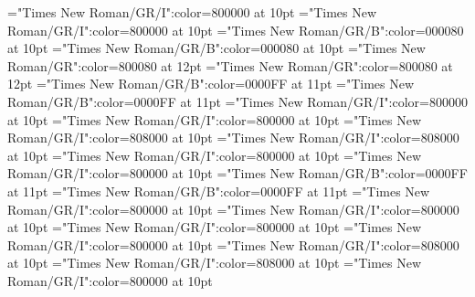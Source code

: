 \documentclass[a4paper,twoside]{article}
\begin{document}
\font\spanesownertypeabbreviationminimallexreferenceminimallexreferencesmainentrycomplex="Times New Roman/GR/I":color=800000 at 10pt
\font\spanownertypeabbreviationminimallexreferenceminimallexreferencesmainentrycomplex="Times New Roman/GR/I":color=800000 at 10pt
\font\spanmxbheadwordconfigtargetconfigtargetsminimallexreferenceminimallexreferencesmainentrycomplex="Times New Roman/GR/B":color=000080 at 10pt
\font\spanheadwordconfigtargetconfigtargetsminimallexreferenceminimallexreferencesmainentrycomplex="Times New Roman/GR/B":color=000080 at 10pt
\font\spanesliteralmeaningmainentrycomplex="Times New Roman/GR":color=800080 at 12pt
\font\spanliteralmeaningmainentrycomplex="Times New Roman/GR":color=800080 at 12pt
\font\spanmxbheadwordvisiblecomplexformbackrefvisiblecomplexformbackrefsmainentrycomplex="Times New Roman/GR/B":color=0000FF at 11pt
\font\spanheadwordvisiblecomplexformbackrefvisiblecomplexformbackrefsmainentrycomplex="Times New Roman/GR/B":color=0000FF at 11pt
\font\spanespartofspeechmorphosyntaxanalysesvisiblecomplexformbackrefsmainentrycomplex="Times New Roman/GR/I":color=800000 at 10pt
\font\spanpartofspeechmorphosyntaxanalysesvisiblecomplexformbackrefsmainentrycomplex="Times New Roman/GR/I":color=800000 at 10pt
\font\spanessummaryvisiblecomplexformbackrefsmainentrycomplex="Times New Roman/GR/I":color=808000 at 10pt
\font\spansummaryvisiblecomplexformbackrefsmainentrycomplex="Times New Roman/GR/I":color=808000 at 10pt
\font\spanmxbheadwordreferencedentryreferencedentriesvisiblevariantentryrefsmainentrycomplex="Times New Roman/GR/I":color=800000 at 10pt
\font\spanheadwordreferencedentryreferencedentriesvisiblevariantentryrefsmainentrycomplex="Times New Roman/GR/I":color=800000 at 10pt
\font\spanmxbheadwordminorentryvariant="Times New Roman/GR/B":color=0000FF at 11pt
\font\spanheadwordminorentryvariant="Times New Roman/GR/B":color=0000FF at 11pt
\font\spanesreverseabbrvariantentrytypesvisiblevariantentryrefsminorentryvariant="Times New Roman/GR/I":color=800000 at 10pt
\font\spanreverseabbrvariantentrytypesvisiblevariantentryrefsminorentryvariant="Times New Roman/GR/I":color=800000 at 10pt
\font\spanmxbheadwordreferencedentryreferencedentriesvisiblevariantentryrefsminorentryvariant="Times New Roman/GR/I":color=800000 at 10pt
\font\spanheadwordreferencedentryreferencedentriesvisiblevariantentryrefsminorentryvariant="Times New Roman/GR/I":color=800000 at 10pt
\font\spanesrestrictionsminorentryvariant="Times New Roman/GR/I":color=808000 at 10pt
\font\spanrestrictionsminorentryvariant="Times New Roman/GR/I":color=808000 at 10pt
\font\spanescommentminorentryvariant="Times New Roman/GR/I":color=800000 at 10pt
\end{document}
